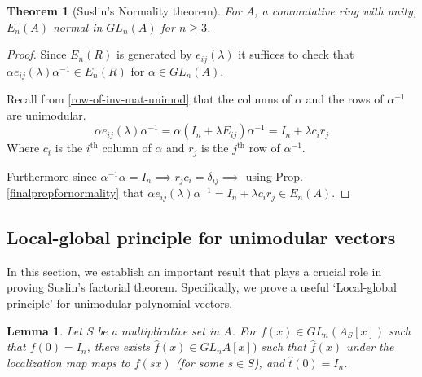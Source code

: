 \documentclass[12pt]{article}
\numberwithin{equation}{section}
\newcounter{dummy} \numberwithin{dummy}{section}
\newtheorem{theorem}[dummy]{Theorem}
\newtheorem{lemma}[dummy]{Lemma}
\newtheorem{proposition}[dummy]{Proposition}
\begin{document}
	\begin{theorem}[Suslin's Normality theorem]
		For $A$, a commutative ring with unity, $E_n(A)$ normal in $GL_n(A)$ for $n \geq 3$. 
	\end{theorem}
	\begin{proof}
		Since $E_n(R)$ is generated by $e_{ij} (\lambda) $ it suffices to check that $\alpha e_{ij}(\lambda) \alpha^{-1} \in E_n(R)$ for $\alpha \in GL_n(A)$.
		
		 Recall from \ref{row-of-inv-mat-unimod} that the columns of $\alpha$ and the rows of $\alpha^{-1}$ are unimodular.
		\[ \alpha e_{ij} (\lambda ) \alpha^{-1}= \alpha(I_n+\lambda E_{ij}) \alpha^{-1} = I_n +\lambda c_i r_j\]
		Where $c_i$ is the $i^\mathrm{th}$ column of $\alpha$ and $r_j$ is the $j^{\mathrm{th}}$ row of $\alpha^{-1}$.
		
		Furthermore since $\alpha^{-1}\alpha =I_n \implies r_jc_i=\delta_{ij} \implies $ using Prop. \ref{finalpropfornormality} that $\alpha e_{ij}(\lambda) \alpha^{-1} = I_n + \lambda c_i r_j \in E_n(A)$.
	\end{proof}
	
		\subsection{Local-global principle for unimodular vectors}
		In this section, we establish an important result that plays a crucial role in proving Suslin’s factorial theorem. Specifically, we prove a useful `Local-global principle' for unimodular polynomial vectors.
		
		
		\begin{lemma}\label{lemlocalglobal}
			Let $S$ be a multiplicative set in $A$. For $f(x) \in GL_n(A_S[x])$ such that $f(0) = I_n$, there exists $\hat{f}(x) \in GL_nA[x])$ such that $\hat{f}(x)$ under the localization map maps to $f(sx)$ (for some $s \in S$), and $\hat{t}(0) = I_n$.
		\end{lemma}
		
\end{document}
